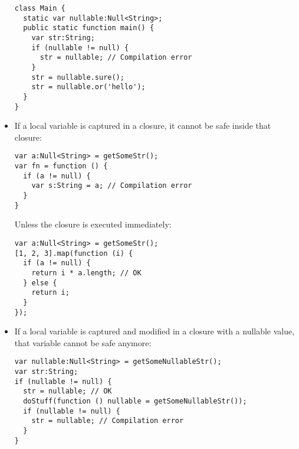 \begin{itemize}
\begin{lstlisting}
class Main {
  static var nullable:Null<String>;
  public static function main() {
    var str:String;
    if (nullable != null) {
      str = nullable; // Compilation error
    }
    str = nullable.sure();
    str = nullable.or('hello');
  }
}
\end{lstlisting}
	\item If a local variable is captured in a closure, it cannot be safe inside that closure:
	\begin{lstlisting}
var a:Null<String> = getSomeStr();
var fn = function () {
  if (a != null) {
    var s:String = a; // Compilation error
  }
}
\end{lstlisting}
	Unless the closure is executed immediately:
	\begin{lstlisting}
var a:Null<String> = getSomeStr();
[1, 2, 3].map(function (i) {
  if (a != null) {
    return i * a.length; // OK
  } else {
    return i;
  }
});
\end{lstlisting}
	\item If a local variable is captured and modified in a closure with a nullable value, that variable cannot be safe anymore:
	\begin{lstlisting}
var nullable:Null<String> = getSomeNullableStr();
var str:String;
if (nullable != null) {
  str = nullable; // OK
  doStuff(function () nullable = getSomeNullableStr());
  if (nullable != null) {
    str = nullable; // Compilation error
  }
}
\end{lstlisting}
\end{itemize}
